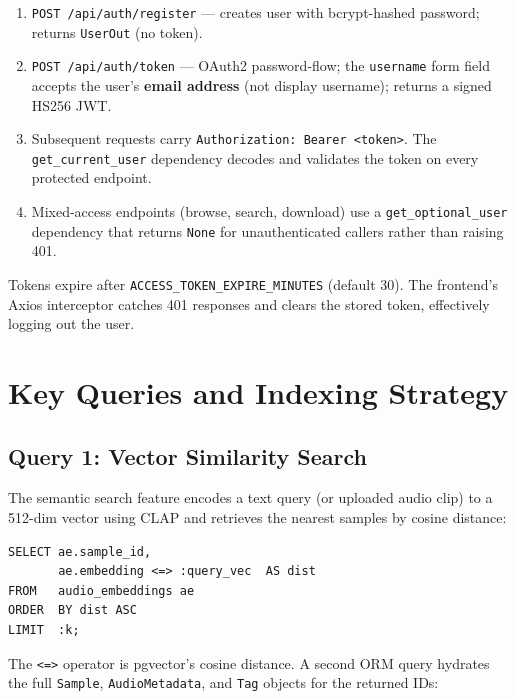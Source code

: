 \documentclass[12pt,letterpaper]{report}
\begin{document}
\begin{enumerate}
  \item \texttt{POST /api/auth/register} --- creates user with bcrypt-hashed password; returns \texttt{UserOut} (no token).
  \item \texttt{POST /api/auth/token} --- OAuth2 password-flow; the \texttt{username} form field accepts the user's \textbf{email address} (not display username); returns a signed HS256 JWT.
  \item Subsequent requests carry \texttt{Authorization: Bearer <token>}. The \texttt{get\_current\_user} dependency decodes and validates the token on every protected endpoint.
  \item Mixed-access endpoints (browse, search, download) use a \texttt{get\_optional\_user} dependency that returns \texttt{None} for unauthenticated callers rather than raising 401.
\end{enumerate}

Tokens expire after \texttt{ACCESS\_TOKEN\_EXPIRE\_MINUTES} (default 30). The frontend's Axios interceptor catches 401 responses and clears the stored token, effectively logging out the user.

\chapter{Key Queries and Indexing Strategy}

\section{Query 1: Vector Similarity Search}

The semantic search feature encodes a text query (or uploaded audio clip) to a 512-dim vector using CLAP and retrieves the nearest samples by cosine distance:

\begin{lstlisting}[style=sqlstyle,
  caption={Phase 1 --- cosine-distance nearest-neighbour lookup via pgvector},
  label={lst:vec-search}]
SELECT ae.sample_id,
       ae.embedding <=> :query_vec  AS dist
FROM   audio_embeddings ae
ORDER  BY dist ASC
LIMIT  :k;
\end{lstlisting}

The \texttt{<=>} operator is pgvector's cosine distance. A second ORM query hydrates the full \texttt{Sample}, \texttt{AudioMetadata}, and \texttt{Tag} objects for the returned IDs:
\end{document}
